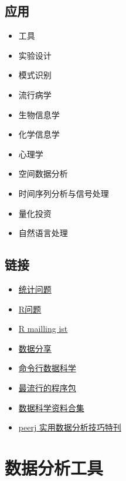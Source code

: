 \documentclass[]{book}
\providecommand{\tightlist}{%
  \setlength{\itemsep}{0pt}\setlength{\parskip}{0pt}}
\begin{document}
\hypertarget{ux5e94ux7528}{%
\section{应用}\label{ux5e94ux7528}}

\begin{itemize}
\tightlist
\item
  工具
\item
  实验设计
\item
  模式识别
\item
  流行病学
\item
  生物信息学
\item
  化学信息学
\item
  心理学
\item
  空间数据分析
\item
  时间序列分析与信号处理
\item
  量化投资
\item
  自然语言处理
\end{itemize}

\hypertarget{ux94feux63a5}{%
\section{链接}\label{ux94feux63a5}}

\begin{itemize}
\tightlist
\item
  \href{https://stats.stackexchange.com/}{统计问题}
\item
  \href{http://stackoverflow.com/}{R问题}
\item
  \href{http://www.r-project.org/mail.html}{R mailling ist}
\item
  \href{http://figshare.com/}{数据分享}
\item
  \href{https://www.datascienceatthecommandline.com}{命令行数据科学}
\item
  \href{https://github.com/kaxap/arl}{最流行的程序包}
\item
  \href{https://github.com/bulutyazilim/awesome-datascience}{数据科学资料合集}
\item
  \href{https://peerj.com/collections/50-practicaldatascistats/}{peerj 实用数据分析技巧特刊}
\end{itemize}

\hypertarget{tool}{%
\chapter{数据分析工具}\label{tool}}
\end{document}
